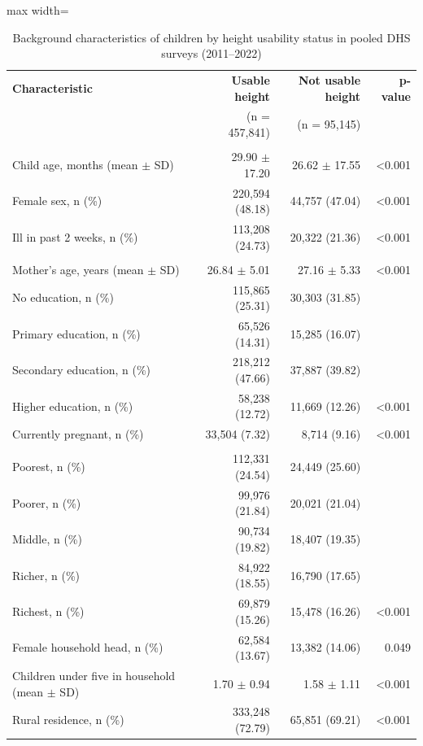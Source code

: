 \begin{table}[htbp]
\centering
\caption{Background characteristics of children by height usability status in pooled DHS surveys (2011--2022)}
\label{tab:descriptive}

\begin{threeparttable}
\small
\renewcommand{\arraystretch}{1.12}
\setlength{\tabcolsep}{5pt}

\begin{adjustbox}{max width=\textwidth}
\begin{tabularx}{\textwidth}{Xrrr}
\toprule
 \textbf{Characteristic} & \textbf{Usable height} & \textbf{Not usable height} & \textbf{p-value} \\ & (n = 457{,}841) & (n = 95{,}145) & \\ \midrule \addlinespace[3pt] \multicolumn{4}{l}{\textbf{Child characteristics}}\\ \addlinespace[2pt] Child age, months (mean $\pm$ SD) & 29.90 $\pm$ 17.20 & 26.62 $\pm$ 17.55 & \textless0.001 \\ Female sex, n (\%) & 220{,}594 (48.18) & 44{,}757 (47.04) & \textless0.001 \\ Ill in past 2 weeks, n (\%) & 113{,}208 (24.73) & 20{,}322 (21.36) & \textless0.001 \\ \addlinespace[4pt] \multicolumn{4}{l}{\textbf{Maternal characteristics}}\\ \addlinespace[2pt] Mother's age, years (mean $\pm$ SD) & 26.84 $\pm$ 5.01 & 27.16 $\pm$ 5.33 & \textless0.001 \\ No education, n (\%) & 115{,}865 (25.31) & 30{,}303 (31.85) & \\ Primary education, n (\%) & 65{,}526 (14.31) & 15{,}285 (16.07) & \\ Secondary education, n (\%) & 218{,}212 (47.66) & 37{,}887 (39.82) & \\ Higher education, n (\%) & 58{,}238 (12.72) & 11{,}669 (12.26) & \textless0.001 \\ Currently pregnant, n (\%) & 33{,}504 (7.32) & 8{,}714 (9.16) & \textless0.001 \\ \addlinespace[4pt] \multicolumn{4}{l}{\textbf{Household characteristics}}\\ \addlinespace[2pt] Poorest, n (\%) & 112{,}331 (24.54) & 24{,}449 (25.60) & \\ Poorer, n (\%) & 99{,}976 (21.84) & 20{,}021 (21.04) & \\ Middle, n (\%) & 90{,}734 (19.82) & 18{,}407 (19.35) & \\ Richer, n (\%) & 84{,}922 (18.55) & 16{,}790 (17.65) & \\ Richest, n (\%) & 69{,}879 (15.26) & 15{,}478 (16.26) & \textless0.001 \\ Female household head, n (\%) & 62{,}584 (13.67) & 13{,}382 (14.06) & 0.049 \\ Children under five in household (mean $\pm$ SD) & 1.70 $\pm$ 0.94 & 1.58 $\pm$ 1.11 & \textless0.001 \\ Rural residence, n (\%) & 333{,}248 (72.79) & 65{,}851 (69.21) & \textless0.001 \\ 
 

\end{tabularx}
\end{adjustbox}
\end{threeparttable}
\end{table}
